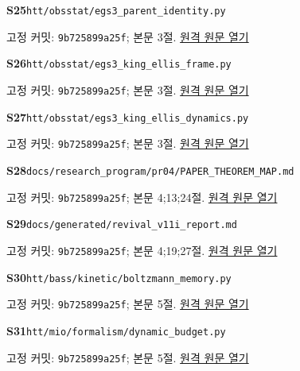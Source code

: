 \documentclass[11pt,a4paper]{article}
\begin{document}
\hypertarget{src:S25}{}\textbf{S25}\quad \nolinkurl{htt/obsstat/egs3_parent_identity.py}\par
{\small 고정 커밋: \texttt{9b725899a25f}; 본문 3절. \href{https://github.com/cosmosapjw-quantum/htt_base/blob/9b725899a25fa410e7c3686ce36afaa667d14646/htt/obsstat/egs3_parent_identity.py}{원격 원문 열기}}\par
\hypertarget{src:S26}{}\textbf{S26}\quad \nolinkurl{htt/obsstat/egs3_king_ellis_frame.py}\par
{\small 고정 커밋: \texttt{9b725899a25f}; 본문 3절. \href{https://github.com/cosmosapjw-quantum/htt_base/blob/9b725899a25fa410e7c3686ce36afaa667d14646/htt/obsstat/egs3_king_ellis_frame.py}{원격 원문 열기}}\par
\hypertarget{src:S27}{}\textbf{S27}\quad \nolinkurl{htt/obsstat/egs3_king_ellis_dynamics.py}\par
{\small 고정 커밋: \texttt{9b725899a25f}; 본문 3절. \href{https://github.com/cosmosapjw-quantum/htt_base/blob/9b725899a25fa410e7c3686ce36afaa667d14646/htt/obsstat/egs3_king_ellis_dynamics.py}{원격 원문 열기}}\par
\hypertarget{src:S28}{}\textbf{S28}\quad \nolinkurl{docs/research_program/pr04/PAPER_THEOREM_MAP.md}\par
{\small 고정 커밋: \texttt{9b725899a25f}; 본문 4;13;24절. \href{https://github.com/cosmosapjw-quantum/htt_base/blob/9b725899a25fa410e7c3686ce36afaa667d14646/docs/research_program/pr04/PAPER_THEOREM_MAP.md}{원격 원문 열기}}\par
\hypertarget{src:S29}{}\textbf{S29}\quad \nolinkurl{docs/generated/revival_v11i_report.md}\par
{\small 고정 커밋: \texttt{9b725899a25f}; 본문 4;19;27절. \href{https://github.com/cosmosapjw-quantum/htt_base/blob/9b725899a25fa410e7c3686ce36afaa667d14646/docs/generated/revival_v11i_report.md}{원격 원문 열기}}\par
\hypertarget{src:S30}{}\textbf{S30}\quad \nolinkurl{htt/bass/kinetic/boltzmann_memory.py}\par
{\small 고정 커밋: \texttt{9b725899a25f}; 본문 5절. \href{https://github.com/cosmosapjw-quantum/htt_base/blob/9b725899a25fa410e7c3686ce36afaa667d14646/htt/bass/kinetic/boltzmann_memory.py}{원격 원문 열기}}\par
\hypertarget{src:S31}{}\textbf{S31}\quad \nolinkurl{htt/mio/formalism/dynamic_budget.py}\par
{\small 고정 커밋: \texttt{9b725899a25f}; 본문 5절. \href{https://github.com/cosmosapjw-quantum/htt_base/blob/9b725899a25fa410e7c3686ce36afaa667d14646/htt/mio/formalism/dynamic_budget.py}{원격 원문 열기}}\par
\end{document}

